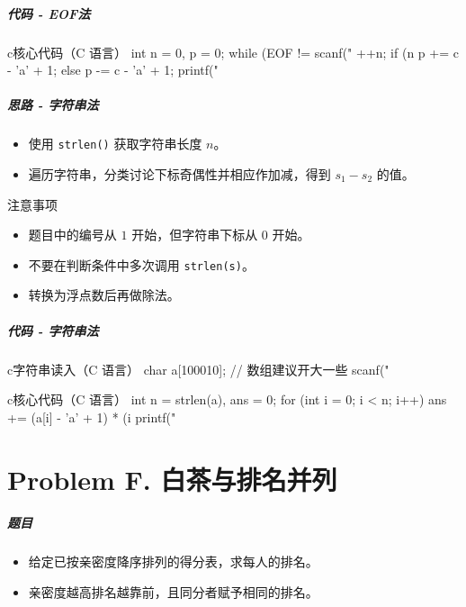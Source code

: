 \documentclass[
     aspectratio=169,                   %
]{beamer}
\begin{document}
\begin{frame}[fragile]
	\frametitle{代码 - EOF法}
	\begin{codeblock}{c}{核心代码（C 语言）}
int n = 0, p = 0;
while (EOF != scanf("%
{
    ++n;
    if (n %
        p += c - 'a' + 1;
    else
        p -= c - 'a' + 1;
}
printf("%
\end{codeblock}
\end{frame}

\begin{frame}
	\frametitle{思路 - 字符串法}
	\begin{itemize}
		\item 使用 \lstinline|strlen()| 获取字符串长度 $n$。
		\item 遍历字符串，分类讨论下标奇偶性并相应作加减，得到 $s_1-s_2$ 的值。
	\end{itemize}
	\begin{alertblock}{注意事项}
		\begin{itemize}
			\item 题目中的编号从 $1$ 开始，但字符串下标从 $0$ 开始。
			\item 不要在判断条件中多次调用 \lstinline|strlen(s)|。
			\item 转换为浮点数后再做除法。
		\end{itemize}
	\end{alertblock}
\end{frame}

\begin{frame}[fragile]
	\frametitle{代码 - 字符串法}
	\begin{codeblock}{c}{字符串读入（C 语言）}
char a[100010]; // 数组建议开大一些
scanf("%
\end{codeblock}
	\begin{codeblock}{c}{核心代码（C 语言）}
int n = strlen(a), ans = 0;
for (int i = 0; i < n; i++) {
    ans += (a[i] - 'a' + 1) * (i %
}
printf("%
\end{codeblock}
\end{frame}


\part{Problem F. 白茶与排名并列}
\begin{frame}
	\frametitle{题目}
	\begin{itemize}
		\item 给定已按亲密度降序排列的得分表，求每人的排名。
		\item 亲密度越高排名越靠前，且同分者赋予相同的排名。
	\end{itemize}
\end{frame}
\end{document}
